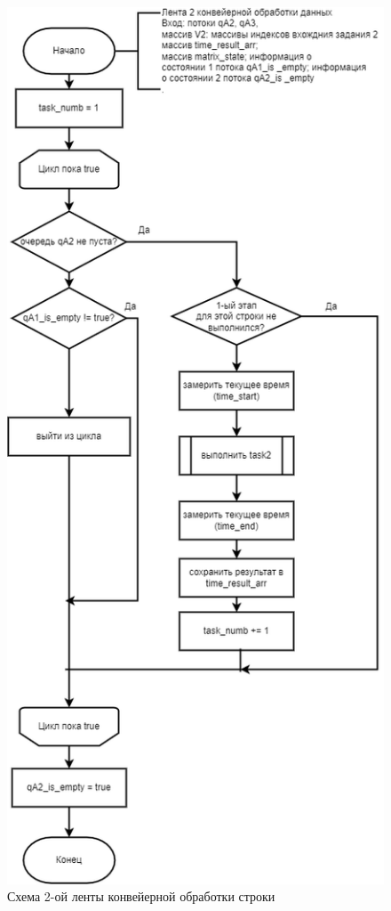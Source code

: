 \begin{figure}[h]
	\centering
	\includegraphics[scale=0.5]{img/parallel_stage_2.png}
	\caption{Схема 2-ой ленты конвейерной обработки строки}
	\label{fig:parallel_stage_2}
\end{figure} 

